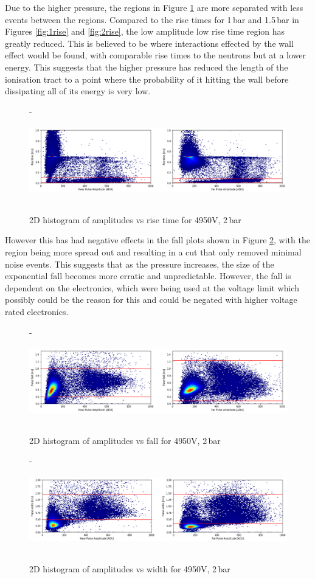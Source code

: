 \documentclass[a4paper]{article}
\begin{document}
\noindent Due to the higher pressure, the regions in Figure \ref{fig:3rise} are more separated with less events between the regions. Compared to the rise times for 1\,bar and 1.5\,bar in Figures \ref{fig:1rise} and \ref{fig:2rise}, the low amplitude low rise time region has greatly reduced. This is believed to be where interactions effected by the wall effect would be found, with comparable rise times to the neutrons but at a lower energy. This suggests that the higher pressure has reduced the length of the ionisation tract to a point where the probability of it hitting the wall before dissipating all of its energy is very low.
\begin{figure}[H]-
    \centering
    \includegraphics[height=3.7cm]{plots/uk26n000_rise.png}
    \caption{2D histogram of amplitudes vs rise time for 4950V, 2\,bar}   
    \label{fig:3rise}
\end{figure}
\noindent However this has had negative effects in the fall plots shown in Figure \ref{fig:3fall}, with the region being more spread out and resulting in a cut that only removed minimal noise events. This suggests that as the pressure increases, the size of the exponential fall becomes more erratic and unpredictable. However, the fall is dependent on the electronics, which were being used at the voltage limit which possibly could be the reason for this and could be negated with higher voltage rated electronics.
\begin{figure}[H]-
    \centering
    \includegraphics[height=3.7cm]{plots/uk26n000_fall.png}
    \caption{2D histogram of amplitudes vs fall for 4950V, 2\,bar}
    \label{fig:3fall}
\end{figure}
\begin{figure}[H]-
    \centering
    \includegraphics[height=3.7cm]{plots/uk26n000_dur.png}
    \caption{2D histogram of amplitudes vs width  for 4950V, 2\,bar}
    \label{fig:3dur}
\end{figure}
\end{document}
